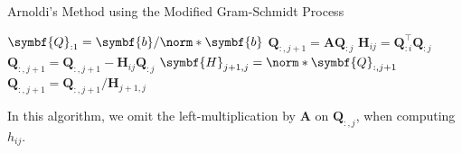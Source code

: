 \documentclass{article}
\begin{document}
\begin{algorithm}[H]
    \caption{Arnoldi's Method using the Modified Gram-Schmidt Process}
    \begin{algorithmic}
        \State \(\symbf{Q}_{:1} = \symbf{b}/\norm*{\symbf{b}}\)
            \State \(\symbf{Q}_{:,j+1} = \symbf{A} \symbf{Q}_{:j}\)
                \State \(\symbf{H}_{ij} = \symbf{Q}_{:i}^\top \symbf{Q}_{:j}\) 
                \State \(\symbf{Q}_{:,j+1} = \symbf{Q}_{:,j+1} - \symbf{H}_{ij} \symbf{Q}_{:j}\)
            \EndFor
            \State \(\symbf{H}_{j+1,j} = \norm*{\symbf{Q}_{:,j+1}}\) 
                \State \(\symbf{Q}_{:,j+1} = \symbf{Q}_{:,j+1} / \symbf{H}_{j+1,j}\) 
            \EndIf
        \EndFor
    \end{algorithmic}
\end{algorithm}
In this algorithm, we omit the left-multiplication by \(\symbf{A}\) on
\(\symbf{Q}_{:,j}\), when computing \(h_{ij}\).
\end{document}
